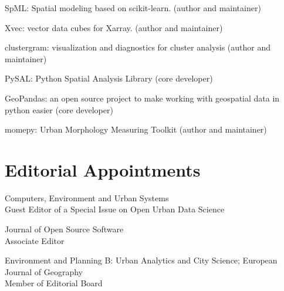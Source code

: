 \documentclass[11pt,a4paper]{report}
\begin{document}
    \begin{tablist}

        \item[2026--] \tab{}SpML: Spatial modeling based on scikit-learn. (author and maintainer)
        \item[2022--] \tab{}Xvec: vector data cubes for Xarray. (author and maintainer)
        \item[2020--] \tab{}clustergram: visualization and diagnostics for cluster analysis (author and maintainer)
        \item[2020--] \tab{}PySAL: Python Spatial Analysis Library (core developer)
        \item[2019--] \tab{}GeoPandas: an open source project to make working with geospatial data in python easier (core developer)
        \item[2018--] \tab{}momepy: Urban Morphology Measuring Toolkit (author and maintainer)

    \end{tablist}

    \section*{Editorial Appointments}

    \begin{tablist}

        \item[2025--26] \tab{}Computers, Environment and Urban Systems\\
                            Guest Editor of a Special Issue on Open Urban Data Science

        \item[2021--25] \tab{}Journal of Open Source Software \\
                            Associate Editor
    
       \item[2026--] \tab{}Environment and Planning B: Urban Analytics and City Science; European Journal of Geography\\
                            Member of Editorial Board
    \end{tablist}
\end{document}
